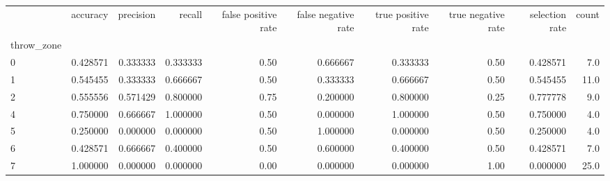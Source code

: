 \begin{tabular}{lrrrrrrrrr}
\toprule
{} &  accuracy &  precision &    recall &  false positive rate &  false negative rate &  true positive rate &  true negative rate &  selection rate &  count \\
throw\_zone &           &            &           &                      &                      &                     &                     &                 &        \\
\midrule
0          &  0.428571 &   0.333333 &  0.333333 &                 0.50 &             0.666667 &            0.333333 &                0.50 &        0.428571 &    7.0 \\
1          &  0.545455 &   0.333333 &  0.666667 &                 0.50 &             0.333333 &            0.666667 &                0.50 &        0.545455 &   11.0 \\
2          &  0.555556 &   0.571429 &  0.800000 &                 0.75 &             0.200000 &            0.800000 &                0.25 &        0.777778 &    9.0 \\
4          &  0.750000 &   0.666667 &  1.000000 &                 0.50 &             0.000000 &            1.000000 &                0.50 &        0.750000 &    4.0 \\
5          &  0.250000 &   0.000000 &  0.000000 &                 0.50 &             1.000000 &            0.000000 &                0.50 &        0.250000 &    4.0 \\
6          &  0.428571 &   0.666667 &  0.400000 &                 0.50 &             0.600000 &            0.400000 &                0.50 &        0.428571 &    7.0 \\
7          &  1.000000 &   0.000000 &  0.000000 &                 0.00 &             0.000000 &            0.000000 &                1.00 &        0.000000 &   25.0 \\
\bottomrule
\end{tabular}
